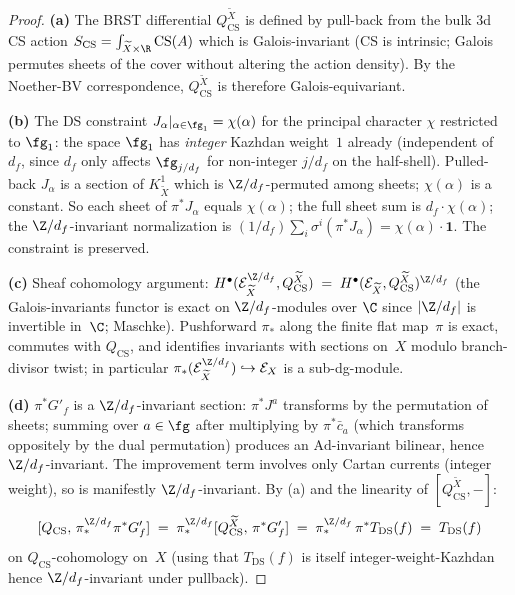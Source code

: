 \begin{proof}
\textbf{(a)} The BRST differential $Q_{\mathrm{CS}}^{\widetilde X}$
is defined by pull-back from the bulk 3d CS action
$S_{\mathrm{CS}} = \int_{\widetilde X \times \R} \mathrm{CS}(A)$
which is Galois-invariant (CS is intrinsic; Galois permutes sheets
of the cover without altering the action density). By the
Noether-BV correspondence, $Q_{\mathrm{CS}}^{\widetilde X}$ is
therefore Galois-equivariant.

\textbf{(b)} The DS constraint
$J_{\alpha}|_{\alpha \in \fg_{1}} = \chi(\alpha)$ for the principal
character $\chi$ restricted to $\fg_{1}$: the space $\fg_{1}$ has
\emph{integer} Kazhdan weight~$1$ already (independent of~$d_{f}$,
since $d_{f}$ only affects $\fg_{j/d_{f}}$ for non-integer $j/d_{f}$
on the half-shell). Pulled-back $J_{\alpha}$ is a section of
$K_{\widetilde X}^{1}$ which is $\Z/d_{f}$-permuted among sheets;
$\chi(\alpha)$ is a constant. So each sheet of $\pi^{*}J_{\alpha}$
equals $\chi(\alpha)$; the full sheet sum is
$d_{f} \cdot \chi(\alpha)$; the $\Z/d_{f}$-invariant normalization
is $(1/d_{f}) \sum_{i} \sigma^{i}(\pi^{*}J_{\alpha}) = \chi(\alpha)
\cdot \mathbf{1}$. The constraint is preserved.

\textbf{(c)} Sheaf cohomology argument:
$H^{\bullet}(\mathcal{E}_{\widetilde X}^{\Z/d_{f}}, Q_{\mathrm{CS}}^{\widetilde X})
\;=\; H^{\bullet}(\mathcal{E}_{\widetilde X}, Q_{\mathrm{CS}}^{\widetilde X})^{\Z/d_{f}}$
(the Galois-invariants functor is exact on $\Z/d_{f}$-modules over
$\C$ since $|\Z/d_{f}|$ is invertible in~$\C$; Maschke). Pushforward
$\pi_{*}$ along the finite flat map~$\pi$ is exact, commutes with
$Q_{\mathrm{CS}}$, and identifies invariants with sections on~$X$
modulo branch-divisor twist; in particular
$\pi_{*}(\mathcal{E}_{\widetilde X}^{\Z/d_{f}}) \hookrightarrow
 \mathcal{E}_{X}$
is a sub-dg-module.

\textbf{(d)} $\pi^{*}G'_{f}$ is a $\Z/d_{f}$-invariant section:
$\pi^{*}J^{a}$ transforms by the permutation of sheets; summing
over $a \in \fg$ after multiplying by $\pi^{*}\bar c_{a}$ (which
transforms oppositely by the dual permutation) produces an
$\mathrm{Ad}$-invariant bilinear, hence $\Z/d_{f}$-invariant. The
improvement term involves only Cartan currents (integer weight),
so is manifestly $\Z/d_{f}$-invariant. By (a) and the linearity of
$[Q_{\mathrm{CS}}^{\widetilde X}, -]$:
\[
[Q_{\mathrm{CS}},\, \pi_{*}^{\Z/d_{f}} \pi^{*}G'_{f}]
\;=\; \pi_{*}^{\Z/d_{f}}[Q_{\mathrm{CS}}^{\widetilde X},\, \pi^{*}G'_{f}]
\;=\; \pi_{*}^{\Z/d_{f}}\,\pi^{*}T_{\mathrm{DS}}(f)
\;=\; T_{\mathrm{DS}}(f)
\]
on $Q_{\mathrm{CS}}$-cohomology on~$X$ (using that $T_{\mathrm{DS}}(f)$
is itself integer-weight-Kazhdan hence $\Z/d_{f}$-invariant under
pullback).
\end{proof}

